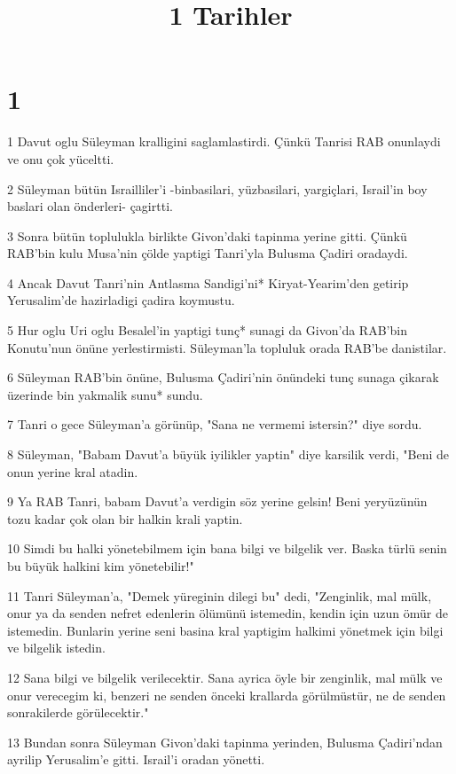 

\title{1 Tarihler}


\chapter{1}

\par 1 Davut oglu Süleyman kralligini saglamlastirdi. Çünkü Tanrisi RAB onunlaydi ve onu çok yüceltti.
\par 2 Süleyman bütün Israilliler'i -binbasilari, yüzbasilari, yargiçlari, Israil'in boy baslari olan önderleri- çagirtti.
\par 3 Sonra bütün toplulukla birlikte Givon'daki tapinma yerine gitti. Çünkü RAB'bin kulu Musa'nin çölde yaptigi Tanri'yla Bulusma Çadiri oradaydi.
\par 4 Ancak Davut Tanri'nin Antlasma Sandigi'ni* Kiryat-Yearim'den getirip Yerusalim'de hazirladigi çadira koymustu.
\par 5 Hur oglu Uri oglu Besalel'in yaptigi tunç* sunagi da Givon'da RAB'bin Konutu'nun önüne yerlestirmisti. Süleyman'la topluluk orada RAB'be danistilar.
\par 6 Süleyman RAB'bin önüne, Bulusma Çadiri'nin önündeki tunç sunaga çikarak üzerinde bin yakmalik sunu* sundu.
\par 7 Tanri o gece Süleyman'a görünüp, "Sana ne vermemi istersin?" diye sordu.
\par 8 Süleyman, "Babam Davut'a büyük iyilikler yaptin" diye karsilik verdi, "Beni de onun yerine kral atadin.
\par 9 Ya RAB Tanri, babam Davut'a verdigin söz yerine gelsin! Beni yeryüzünün tozu kadar çok olan bir halkin krali yaptin.
\par 10 Simdi bu halki yönetebilmem için bana bilgi ve bilgelik ver. Baska türlü senin bu büyük halkini kim yönetebilir!"
\par 11 Tanri Süleyman'a, "Demek yüreginin dilegi bu" dedi, "Zenginlik, mal mülk, onur ya da senden nefret edenlerin ölümünü istemedin, kendin için uzun ömür de istemedin. Bunlarin yerine seni basina kral yaptigim halkimi yönetmek için bilgi ve bilgelik istedin.
\par 12 Sana bilgi ve bilgelik verilecektir. Sana ayrica öyle bir zenginlik, mal mülk ve onur verecegim ki, benzeri ne senden önceki krallarda görülmüstür, ne de senden sonrakilerde görülecektir."
\par 13 Bundan sonra Süleyman Givon'daki tapinma yerinden, Bulusma Çadiri'ndan ayrilip Yerusalim'e gitti. Israil'i oradan yönetti.
